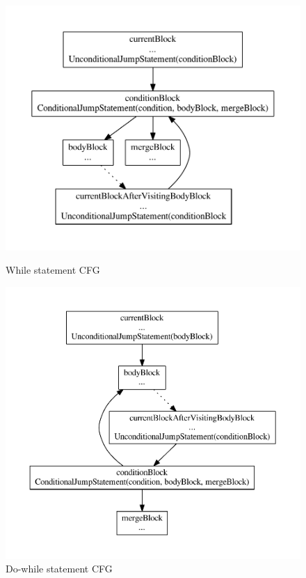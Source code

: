 \begin{figure}[htb]
    \centering
    \begin{minipage}[b]{0.45\textwidth}
        \centering
        \includegraphics[width=\textwidth]{src/graph/while.pdf}
        \caption{While statement CFG\label{img:while-statement}}
    \end{minipage}
    \hfill
    \begin{minipage}[b]{0.45\textwidth}
        \centering
        \includegraphics[width=\textwidth]{src/graph/do-while.pdf}
        \caption{Do-while statement CFG\label{img:do-while-statement}}
    \end{minipage}
\end{figure}